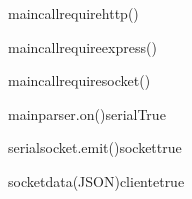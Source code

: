 \begin {sequencediagram}



\begin{call} {main}{call}{require}{http()}
\end{call}

\begin{call}{main}{call}{require}{express()}
 \end{call}

 \begin{call}[1]{main}{call}{require}{socket()}
 \end{call}

\begin{call} {main}{parser.on()}{serial}{True}
	\begin{call}{serial}{socket.emit()}{socket}{true}
			\begin{call}{socket}{data(JSON)}{cliente}{true}
			\end{call}
	\end{call}
	
\end{call}
\end {sequencediagram}